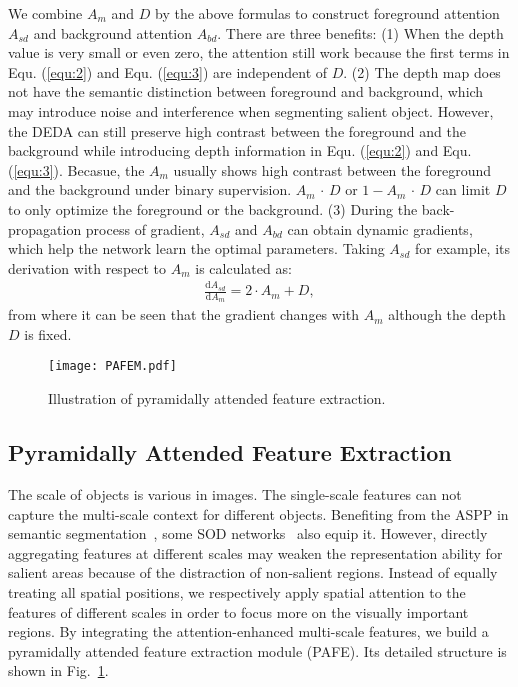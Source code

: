 \documentclass[runningheads]{llncs}
\begin{document}
We combine $A_{m}$ and $D$ by the above formulas to construct foreground attention $A_{sd}$ and background attention $A_{bd}$. 
There are three benefits: (1) When the depth value is very small or even zero, the attention still work because the first terms in Equ. (\ref{equ:2}) and Equ. (\ref{equ:3}) are independent of $D$. (2) The depth map does not have the semantic distinction between foreground and background, which may introduce noise and interference when segmenting salient object. However, the DEDA can still preserve high contrast between the foreground and the background while introducing depth information in Equ. (\ref{equ:2}) and Equ. (\ref{equ:3}). Becasue, the $A_{m}$ usually shows high contrast between the foreground and the background under binary supervision. $A_{m}$ $\cdot$ $D$ or $1-A_{m}$ $\cdot$ $D$ can limit $D$ to only optimize the foreground or the background.
(3) During the back-propagation process of gradient, $A_{sd}$ and $A_{bd}$ can obtain dynamic gradients, which help the network learn the optimal parameters. Taking  $A_{sd}$ for example, its derivation with respect to $A_{m}$ is calculated as:
\begin{equation}\label{equ:4}
\begin{split}
\frac{\mathrm{d}A_{sd}}{\mathrm{d}A_{m}} = 2 \cdot A_{m} + D,
\end{split} 
\end{equation}
from where it can be seen that the gradient changes with $A_{m}$ although the depth $D$ is fixed. 

\begin{figure}[t]
\centering
\texttt{[image: PAFEM.pdf]}\\
 

\caption{Illustration of pyramidally attended feature extraction.}
\label{fig:PAFEM}
\end{figure}


\subsection{Pyramidally Attended Feature Extraction}\label{sec:PAFEM}
The scale of objects is various in images. The single-scale features can not capture the multi-scale context for different objects. Benefiting from the ASPP in semantic segmentation~\cite{Deeplab}, some SOD networks~\cite{R3Net,BMPM,PFA} also equip it. 
However, directly aggregating features at different scales may weaken the representation ability for salient areas because of the distraction of non-salient regions. Instead of equally treating all spatial positions, we respectively apply spatial attention to the features of different scales in order to focus more on the visually important regions.
By integrating the attention-enhanced multi-scale features, we build a pyramidally attended feature extraction module (PAFE). Its detailed structure is shown in Fig.~\ref{fig:PAFEM}.
\end{document}
